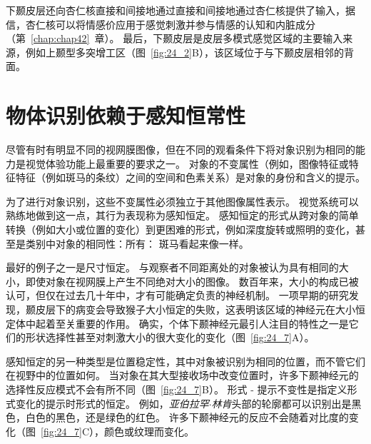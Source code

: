 下颞皮层还向杏仁核直接和间接地通过直接和间接地通过杏仁核提供了输入，据信，杏仁核可以将情感价应用于感觉刺激并参与情感的认知和内脏成分（第~\ref{chap:chap42}~章）。
最后，下颞皮层是皮层多模式感觉区域的主要输入来源，例如上颞型多突增工区（图~\ref{fig:24_2}B），该区域位于与下颞皮层相邻的背面。



\section{物体识别依赖于感知恒常性}

尽管有时有明显不同的视网膜图像，但在不同的观看条件下将对象识别为相同的能力是视觉体验功能上最重要的要求之一。
对象的不变属性（例如，图像特征或特征特征（例如斑马的条纹）之间的空间和色素关系）是对象的身份和含义的提示。


为了进行对象识别，这些不变属性必须独立于其他图像属性表示。
视觉系统可以熟练地做到这一点，其行为表现称为感知恒定。
感知恒定的形式从跨对象的简单转换（例如大小或位置的变化）到更困难的形式，例如深度旋转或照明的变化，甚至是类别中对象的相同性：所有： 斑马看起来像一样。


最好的例子之一是尺寸恒定。
与观察者不同距离处的对象被认为具有相同的大小，即使对象在视网膜上产生不同绝对大小的图像。
数百年来，大小的构成已被认可，但仅在过去几十年中，才有可能确定负责的神经机制。
一项早期的研究发现，颞皮层下的病变会导致猴子大小恒定的失败，这表明该区域的神经元在大小恒定体中起着至关重要的作用。
确实，个体下颞神经元最引人注目的特性之一是它们的形状选择性甚至对刺激大小的很大变化的变化（图~\ref{fig:24_7}A）。


感知恒定的另一种类型是位置稳定性，其中对象被识别为相同的位置，而不管它们在视野中的位置如何。
当对象在其大型接收场中改变位置时，许多下颞神经元的选择性反应模式不会有所不同（图~\ref{fig:24_7}B）。
形式 - 提示不变性是指定义形式变化的提示时形式的恒定。
例如，\textit{亚伯拉罕$\cdot$林肯}头部的轮廓都可以识别出是黑色，白色的黑色，还是绿色的红色。 
许多下颞神经元的反应不会随着对比度的变化（图~\ref{fig:24_7}C），颜色或纹理而变化。


